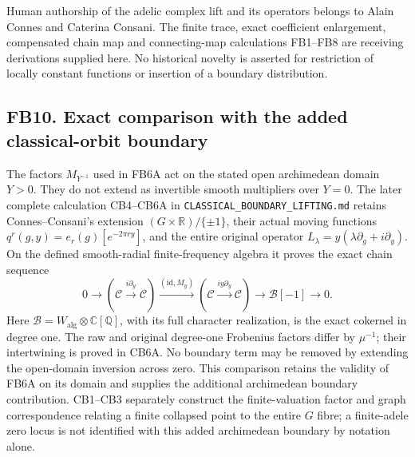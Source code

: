 Human authorship of the adelic complex lift and its operators belongs to
Alain Connes and Caterina Consani. The finite trace, exact coefficient
enlargement, compensated chain map and connecting-map calculations
FB1--FB8 are receiving derivations supplied here. No historical novelty
is asserted for restriction of locally constant functions or insertion
of a boundary distribution.

\subsection{FB10. Exact comparison with the added classical-orbit
boundary}\label{fb10.-exact-comparison-with-the-added-classical-orbit-boundary}

The factors \(M_{Y^{-1}}\) used in FB6A act on the stated open
archimedean domain \(Y>0\). They do not extend as invertible smooth
multipliers over \(Y=0\). The later complete calculation CB4--CB6A in
\nolinkurl{CLASSICAL_BOUNDARY_LIFTING.md} retains Connes--Consani's extension
\((G\times\mathbb R)/\{\pm1\}\), their actual moving functions
\(q^r(g,y)=e_r(g)[e^{-2\pi r y}]\), and the entire original operator
\(L_\lambda=y(\lambda\partial_g+i\partial_y)\). On the defined
smooth-radial finite-frequency algebra it proves the exact chain
sequence \[
0\longrightarrow(\mathcal C\xrightarrow{i\partial_y}\mathcal C)
\xrightarrow{(\mathrm{id},M_y)}
(\mathcal C\xrightarrow{iy\partial_y}\mathcal C)
\longrightarrow\mathcal B[-1]\longrightarrow0.
\] Here \(\mathcal B=W_{\mathrm{alg}}\otimes\mathbb C[\mathbb Q]\), with
its full character realization, is the exact cokernel in degree one. The
raw and original degree-one Frobenius factors differ by \(\mu^{-1}\);
their intertwining is proved in CB6A. No boundary term may be removed by
extending the open-domain inversion across zero. This comparison retains
the validity of FB6A on its domain and supplies the additional
archimedean boundary contribution. CB1--CB3 separately construct the
finite-valuation factor and graph correspondence relating a finite
collapsed point to the entire \(G\) fibre; a finite-adele zero locus is
not identified with this added archimedean boundary by notation alone.
